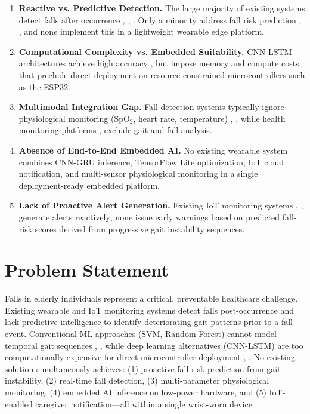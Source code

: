 \documentclass[conference]{IEEEtran}
\begin{document}
\begin{enumerate}
    \item \textbf{Reactive vs. Predictive Detection.} The large majority of existing systems detect falls after occurrence \cite{b25}, \cite{b4}, \cite{b35}. Only a minority address fall risk prediction \cite{b17}, \cite{b2}, and none implement this in a lightweight wearable edge platform.
    
    \item \textbf{Computational Complexity vs. Embedded Suitability.} CNN-LSTM architectures achieve high accuracy \cite{b13}, \cite{b5} but impose memory and compute costs that preclude direct deployment on resource-constrained microcontrollers such as the ESP32.
    
    \item \textbf{Multimodal Integration Gap.} Fall-detection systems typically ignore physiological monitoring (SpO$_2$, heart rate, temperature) \cite{b13}, \cite{b14}, while health monitoring platforms \cite{b10}, \cite{b23} exclude gait and fall analysis.
    
    \item \textbf{Absence of End-to-End Embedded AI.} No existing wearable system combines CNN-GRU inference, TensorFlow Lite optimization, IoT cloud notification, and multi-sensor physiological monitoring in a single deployment-ready embedded platform.
    
    \item \textbf{Lack of Proactive Alert Generation.} Existing IoT monitoring systems \cite{b7}, \cite{b9}, \cite{b23} generate alerts reactively; none issue early warnings based on predicted fall-risk scores derived from progressive gait instability sequences.
\end{enumerate}

\section{Problem Statement}

Falls in elderly individuals represent a critical, preventable healthcare challenge. Existing wearable and IoT monitoring systems detect falls post-occurrence and lack predictive intelligence to identify deteriorating gait patterns prior to a fall event. Conventional ML approaches (SVM, Random Forest) cannot model temporal gait sequences \cite{b3}, \cite{b4}, while deep learning alternatives (CNN-LSTM) are too computationally expensive for direct microcontroller deployment \cite{b13}, \cite{b5}. No existing solution simultaneously achieves: (1) proactive fall risk prediction from gait instability, (2) real-time fall detection, (3) multi-parameter physiological monitoring, (4) embedded AI inference on low-power hardware, and (5) IoT-enabled caregiver notification---all within a single wrist-worn device.
\end{document}
